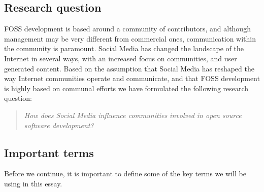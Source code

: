 \documentclass[a4paper,11pt]{article} %
\begin{document}
\subsection{Research question}

FOSS development is based around a community of
contributors, and although management may be very different from commercial
ones, communication within the community is paramount. Social Media has
changed the landscape of the Internet in several ways, with an increased
focus on communities, and user generated content\cite{Kaplan201059}.
Based on the assumption that Social Media has reshaped the way Internet communities
operate and communicate, and that FOSS development is highly based on communal efforts
we have formulated the following research question:
\begin{quote}
  \textit{How does Social Media influence communities involved in open source
    software development?}
\end{quote}


\clearpage

\subsection{Important terms}
Before we continue, it is important to define some of the key terms we will
be using in this essay.
\end{document}
